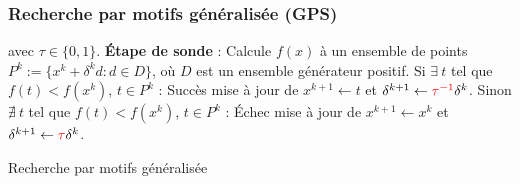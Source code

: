 \documentclass{beamer}
\newcommand\tab[1][1cm]{\hspace*{#1}}
\newcommand{\GPS}{\textsf{GPS}}
\begin{document}
\begin{frame}
\frametitle{Recherche par motifs généralisée (\GPS)}
\begin{algorithm}[H]
\begin{algorithmic}[]
\STATE avec $\tau \in \{0,1\}$.
\STATE \textbf{Étape de sonde} : Calcule $f(x)$ à un ensemble de points $P^k:=\{x^k+\delta ^k d:d\in D\}$, où {\color{red}$D$ est un ensemble générateur positif.}
\STATE
\STATE Si $\exists~t$ tel que $f(t) < f(x^k)$, $t\in P^k$ : Succès
\STATE \tab mise à jour de $x^{k+1}\leftarrow t$ et $\delta^{k+1} \leftarrow {\color{red}\tau^{-1}}\delta^k$.
\STATE
\STATE Sinon $\nexists~t$ tel que $f(t) < f(x^k)$, $t\in P^k$ : Échec
\STATE \tab mise à jour de $x^{k+1}\leftarrow x^k$ et $\delta^{k+1} \leftarrow {\color{red}\tau}\delta^k$.
\ENDFOR
\end{algorithmic}
\caption{Recherche par motifs généralisée}
\label{alg:gps}
\end{algorithm}
\end{frame}
\end{document}
